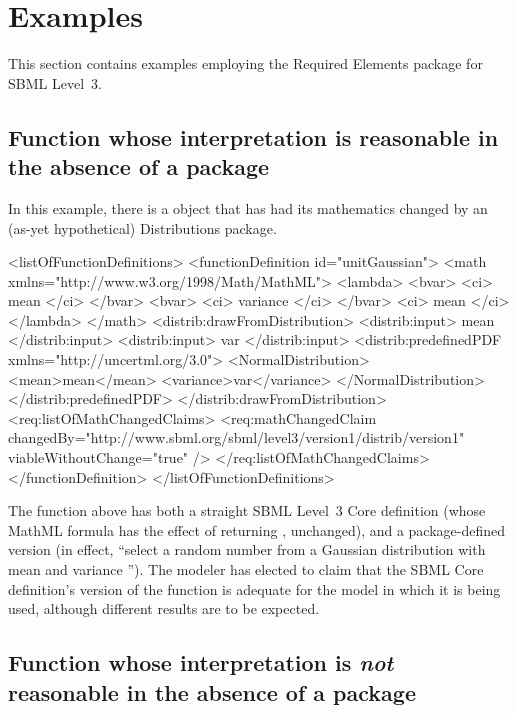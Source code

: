 
\section{Examples}
\label{examples}

This section contains examples employing the Required Elements package for SBML Level~3.

\subsection{Function whose interpretation is reasonable in the absence of a package}

In this example, there is a \FunctionDefinition object that has had its mathematics changed by an (as-yet hypothetical) Distributions package.

\begin{example}
<listOfFunctionDefinitions> 
  <functionDefinition id="unitGaussian"> 
    <math xmlns="http://www.w3.org/1998/Math/MathML"> 
      <lambda>
        <bvar>
          <ci> mean </ci>
        </bvar>
        <bvar>
          <ci> variance </ci>
        </bvar>
        <ci> mean </ci>
      </lambda>
    </math> 
    <distrib:drawFromDistribution>
      <distrib:input> mean </distrib:input>
      <distrib:input> var </distrib:input>
      <distrib:predefinedPDF xmlns="http://uncertml.org/3.0">
        <NormalDistribution>
           <mean>mean</mean>
           <variance>var</variance>
         </NormalDistribution>
      </distrib:predefinedPDF>
    </distrib:drawFromDistribution>
    <req:listOfMathChangedClaims>
      <req:mathChangedClaim changedBy="http://www.sbml.org/sbml/level3/version1/distrib/version1"
                            viableWithoutChange="true" />
    </req:listOfMathChangedClaims>
  </functionDefinition> 
</listOfFunctionDefinitions> 
\end{example}

The function  above has both a straight SBML Level~3 Core definition (whose MathML formula has the effect of returning , unchanged), and a package-defined version (in effect, ``select a random number from a Gaussian distribution with mean  and variance ''). The modeler has elected to claim that the SBML Core definition's version of the function is adequate for the model in which it is being used, although different results are to be expected.


\subsection{Function whose interpretation is \emph{not} reasonable in the absence of a package}

